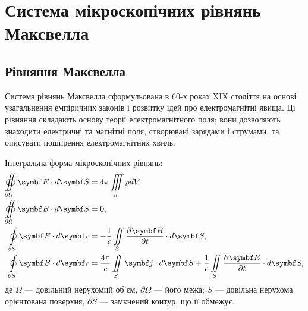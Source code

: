 
\newpage
\chapter{Система \mbox{мікроскопічних} рівнянь Максвелла}


\section{Рівняння Максвелла}

Система рівнянь Максвелла сформульована в 60-х роках XIX століття на основі узагальнення емпіричних
законів і розвитку ідей про електромагнітні явища. Ці рівняння складають основу теорії
електромагнітного поля; вони дозволяють знаходити електричні та магнітні поля, створювані зарядами і
струмами, та описувати поширення електромагнітних хвиль.

Інтегральна форма мікроскопічних рівнянь:
\begin{align}
	\oiint\limits_{\partial\Omega} \Efield\cdot d\vect{S} & = 4\pi\iiint\limits_{\Omega}\rho dV   \label{Int
	I},                                                                                                         \\
	\oiint\limits_{\partial\Omega} \Bfield\cdot d\vect{S} & = 0   \label{Int
	II},                                                                                                                                   \\
	\oint\limits_{\partial S} \Efield\cdot d\vect{r}  & = - \frac1c \iint\limits_S
	\frac{\partial\Bfield}{\partial t}\cdot d\vect{S}  \label{Int
	III},                                                          \\
	\oint\limits_{\partial S} \Bfield\cdot d\vect{r}  & =\dfrac{4\pi}{c} \iint\limits_S \vect{j}\cdot d\vect{S} +\frac{1}{c} \iint\limits_S
	\frac{\partial\Efield}{\partial t}\cdot d\vect{S}  \label{Int IV},
\end{align}
де $\Omega$ --- довільний нерухомий об'єм, $\partial\Omega$ --- його межа; $S$ --- довільна нерухома орієнтована поверхня, $\partial S$ --- замкнений
контур, що її обмежує.


